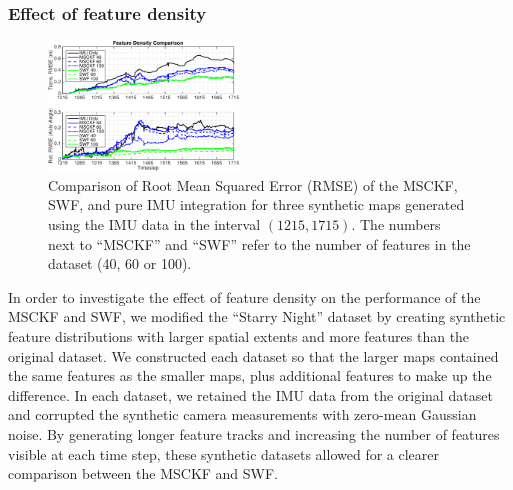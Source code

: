 \documentclass[letterpaper, 10 pt, conference]{ieeeconf}  %
\begin{document}


\subsubsection{Effect of feature density}
\begin{figure}
    \centering
    \includegraphics[width=0.45\textwidth]{figs/RMSE-Comparison-Feat-Density-1215-1715-Noisy}

    \caption{Comparison of Root Mean Squared Error (RMSE) of the MSCKF, SWF, and pure IMU integration for three synthetic maps generated using the IMU data in the interval $(1215,1715)$. The numbers next to ``MSCKF'' and ``SWF'' refer to the number of features in the dataset (40, 60 or 100).}
    \label{fig:comp_3}
    \vspace{-0.4cm}
\end{figure}

In order to investigate the effect of feature density on the performance of the MSCKF and SWF, we modified the ``Starry Night'' dataset by creating synthetic feature distributions with larger spatial extents and more features than the original dataset.
We constructed each dataset so that the larger maps contained the same features as the smaller maps, plus additional features to make up the difference.
In each dataset, we retained the IMU data from the original dataset and corrupted the synthetic camera measurements with zero-mean Gaussian noise.
By generating longer feature tracks and increasing the number of features visible at each time step, these synthetic datasets allowed for a clearer comparison between the MSCKF and SWF.

\end{document}
